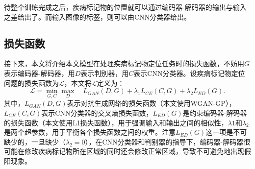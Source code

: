 待整个训练完成之后，疾病标记物的位置就可以通过编码器-解码器的输出与输入之差给出了。而输入图像的标签，则可以由CNN分类器给出。
\subsection{损失函数}\label{subsec:loss_func}
接下来，本文将介绍本文模型在处理疾病标记物定位任务时的损失函数，不妨用$G$表示编码器-解码器，用$D$表示判别器，用$C$表示CNN分类器。设疾病标记物定位问题的损失函数为$\mathcal{L}$，本文将$\mathcal{L}$定义为：
\begin{equation}\label{equ:model_loss_func}
\mathcal{L}=\min _{G, C} \max _{D} \quad L_{GAN}(D, G)+\lambda_{1} L_{C E}(C, G)+\lambda_{2} L_{E D}(G).
\end{equation}
其中，$L_{GAN}(D,G)$表示对抗生成网络的损失函数（本文使用WGAN-GP），$L_{CE}(C, G)$表示CNN分类器的交叉熵损失函数，$L_{E D}(G)$是约束编码器-解码器的损失函数（本文使用L1损失函数），用于强调输入和输出之间的相似性，$\lambda{1}$和$\lambda_{2}$是两个超参数，用于平衡各个损失函数之间的权重。注意$L_{E D}(G)$这一项是不可缺少的，一旦缺少（$\lambda_{2}=0$），在CNN分类器和判别器的指导下，编码器-解码器很可能在修改疾病标记物所在区域的同时还会修改正常区域，导致不可避免地出现假阳现象。

